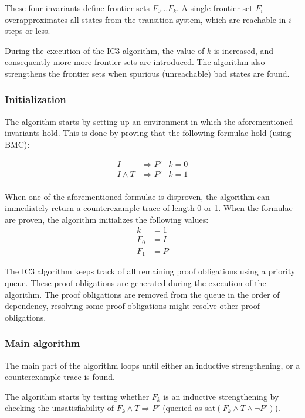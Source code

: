 \documentclass[a4paper]{article}
\begin{document}
These four invariants define frontier sets $F_0 \ldots F_k$. A single frontier set $F_i$ overapproximates all states from the transition system, which are reachable in $i$ steps or less.

During the execution of the IC3 algorithm, the value of $k$ is increased, and consequently more more frontier sets are introduced. The algorithm also strengthens the frontier sets when spurious (unreachable) bad states are found.

\subsubsection{Initialization}
The algorithm starts by setting up an environment in which the aforementioned invariants hold. This is done by proving that the following formulae hold (using BMC):

\begin{align*}
I&\Rightarrow P' & k=0\\
I \land T &\Rightarrow P' & k=1\\
\end{align*}

\newpage
When one of the aforementioned formulae is disproven, the algorithm can immediately return a counterexample trace of length 0 or 1. When the formulae are proven, the algorithm initializes the following values:
\begin{align*}
k &= 1\\
F_0 &= I\\
F_1 &= P
\end{align*}

The IC3 algorithm keeps track of all remaining proof obligations using a priority queue. These proof obligations are generated during the execution of the algorithm. The proof obligations are removed from the queue in the order of dependency, resolving some proof obligations might resolve other proof obligations.

\subsubsection{Main algorithm}
The main part of the algorithm loops until either an inductive strengthening, or a counterexample trace is found.

The algorithm starts by testing whether $F_k$ is an inductive strengthening by checking the unsatisfiability of $F_k \land T \Rightarrow P'$ (queried as sat$(F_k \land T \land \lnot P')$).
\end{document}
